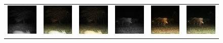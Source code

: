 \begin{figure}[htp!]
\begin{tabularx}{\textwidth}{Y Y Y !{\space} Y Y Y}
        \includegraphics{gfx/conditional-with-cycle-gan-qual/nir_S2_B06_R1_PICT0387.jpg} & \includegraphics{gfx/conditional-with-cycle-gan-qual/cyclegan_S2_B06_R1_PICT0387_fake.png} & \includegraphics{gfx/conditional-with-cycle-gan-qual/diff_cycle_gan_S2_B06_R1_PICT0387_fake.png} & \includegraphics{gfx/conditional-with-cycle-gan-qual/nir_S2_B06_R3_PICT1364.jpg} & \includegraphics{gfx/conditional-with-cycle-gan-qual/cyclegan_S2_B06_R3_PICT1364_fake.png} & \includegraphics{gfx/conditional-with-cycle-gan-qual/diff_cycle_gan_S2_B06_R3_PICT1364_fake.png} \\

\end{tabularx}
\end{figure}
